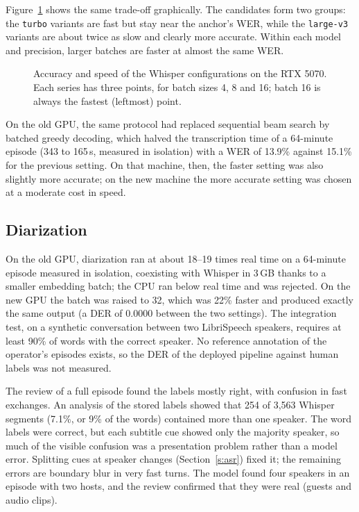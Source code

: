 Figure~\ref{fig:whisper} shows the same trade-off graphically. The candidates form two groups: the \texttt{turbo} variants are fast but stay near the anchor's WER, while the \texttt{large-v3} variants are about twice as slow and clearly more accurate. Within each model and precision, larger batches are faster at almost the same WER.

\begin{figure}[H]
\centering
{}
\caption{Accuracy and speed of the Whisper configurations on the RTX 5070. Each series has three points, for batch sizes 4, 8 and 16; batch 16 is always the fastest (leftmost) point.}
\label{fig:whisper}
\end{figure}

On the old GPU, the same protocol had replaced sequential beam search by batched greedy decoding, which halved the transcription time of a 64-minute episode (343 to 165\,s, measured in isolation) with a WER of 13.9\% against 15.1\% for the previous setting. On that machine, then, the faster setting was also slightly more accurate; on the new machine the more accurate setting was chosen at a moderate cost in speed.

\subsection*{Diarization}

On the old GPU, diarization ran at about 18--19 times real time on a 64-minute episode measured in isolation, coexisting with Whisper in 3\,GB thanks to a smaller embedding batch; the CPU ran below real time and was rejected. On the new GPU the batch was raised to 32, which was 22\% faster and produced exactly the same output (a DER of 0.0000 between the two settings). The integration test, on a synthetic conversation between two LibriSpeech speakers, requires at least 90\% of words with the correct speaker. No reference annotation of the operator's episodes exists, so the DER of the deployed pipeline against human labels was not measured.

The review of a full episode found the labels mostly right, with confusion in fast exchanges. An analysis of the stored labels showed that 254 of 3{,}563 Whisper segments (7.1\%, or 9\% of the words) contained more than one speaker. The word labels were correct, but each subtitle cue showed only the majority speaker, so much of the visible confusion was a presentation problem rather than a model error. Splitting cues at speaker changes (Section~\ref{s:asr}) fixed it; the remaining errors are boundary blur in very fast turns. The model found four speakers in an episode with two hosts, and the review confirmed that they were real (guests and audio clips).

